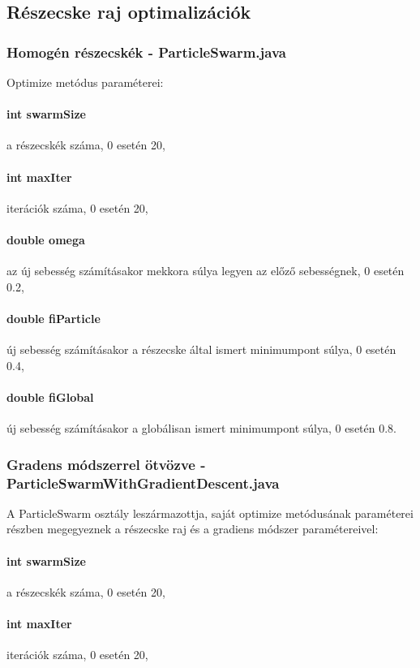 \subsection{Részecske raj optimalizációk}

\subsubsection{Homogén részecskék - ParticleSwarm.java}

Optimize metódus paraméterei:
\paragraph{int swarmSize} a részecskék száma, 0 esetén 20,
\paragraph{int maxIter} iterációk száma, 0 esetén 20,
\paragraph{double omega} az új sebesség számításakor mekkora súlya legyen az előző sebességnek, 0 esetén 0.2,
\paragraph{double fiParticle} új sebesség számításakor a részecske által ismert minimumpont súlya, 0 esetén 0.4,
\paragraph{double fiGlobal} új sebesség számításakor a globálisan ismert minimumpont súlya, 0 esetén 0.8.

\subsubsection{Gradens módszerrel ötvözve - ParticleSwarmWithGradientDescent.java}

A ParticleSwarm osztály leszármazottja, saját optimize metódusának paraméterei részben megegyeznek a részecske raj és a gradiens módszer paramétereivel:
\paragraph{int swarmSize} a részecskék száma, 0 esetén 20,
\paragraph{int maxIter} iterációk száma, 0 esetén 20,
